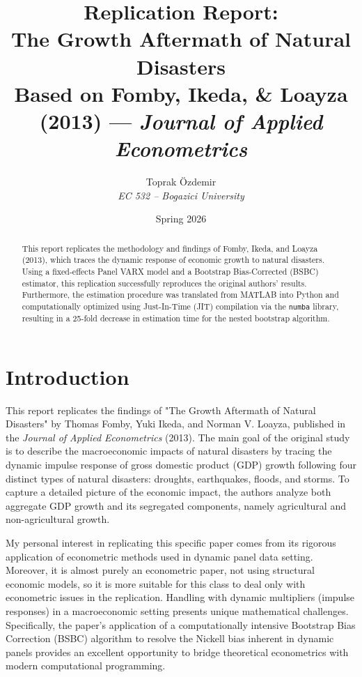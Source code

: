 \documentclass[11pt, a4paper]{article}
\title{\textbf{Replication Report: \\ The Growth Aftermath of Natural Disasters} \vspace{1mm}\\
\large Based on Fomby, Ikeda, \& Loayza (2013) --- \textit{Journal of Applied Econometrics}}
\author{Toprak Özdemir \\ \textit{EC 532 -- Bogazici University}}
\date{Spring 2026}
\begin{document}
\maketitle

\begin{abstract}
\noindent This report replicates the methodology and findings of Fomby, Ikeda, and Loayza (2013), which traces the dynamic response of economic growth to natural disasters. Using a fixed-effects Panel VARX model and a Bootstrap Bias-Corrected (BSBC) estimator, this replication successfully reproduces the original authors' results. Furthermore, the estimation procedure was translated from MATLAB into Python and computationally optimized using Just-In-Time (JIT) compilation via the \texttt{numba} library, resulting in a 25-fold decrease in estimation time for the nested bootstrap algorithm.
\end{abstract}

\vspace{0.5em}

\section{Introduction}

This report replicates the findings of "The Growth Aftermath of Natural Disasters" by Thomas Fomby, Yuki Ikeda, and Norman V. Loayza, published in the \textit{Journal of Applied Econometrics} (2013). The main goal of the original study is to describe the macroeconomic impacts of natural disasters by tracing the dynamic impulse response of gross domestic product (GDP) growth following four distinct types of natural disasters: droughts, earthquakes, floods, and storms. To capture a detailed picture of the economic impact, the authors analyze both aggregate GDP growth and its segregated components, namely agricultural and non-agricultural growth.

My personal interest in replicating this specific paper comes from its rigorous application of econometric methods used in dynamic panel data setting. Moreover, it is almost purely an econometric paper, not using structural economic models, so it is more suitable for this class to deal only with econometric issues in the replication. Handling with dynamic multipliers (impulse responses) in a macroeconomic setting presents unique mathematical challenges. Specifically, the paper's application of a computationally intensive Bootstrap Bias Correction (BSBC) algorithm to resolve the Nickell bias inherent in dynamic panels provides an excellent opportunity to bridge theoretical econometrics with modern computational programming.
\end{document}
